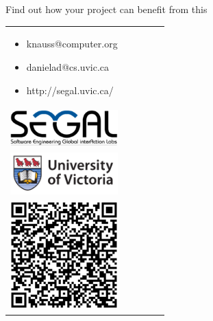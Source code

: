 \documentclass[final]{beamer} %
\begin{document}
\begin{frame}{}
\begin{columns}[b]
  \begin{column}{.45\linewidth}
    \begin{block}{Find out how your project can benefit from this}
    \begin{tabular}{v{.45\linewidth}V{0.23\linewidth}V{0.23\linewidth}}
  \vspace{-1cm}
    \begin{itemize}
    \item knauss{@}computer.org
    \item danielad{@}cs.uvic.ca
    \item http://segal.uvic.ca/
    \end{itemize}
& ~\\ \vspace{-1cm}
    \includegraphics[width=7cm]{img/segal-logo_wbg} \\  \vspace{2\columnsep}
    \includegraphics[width=7cm]{img/uvic-logo_wbg}
& ~\\ \vspace{-1cm}
   \includegraphics[width=5.5cm]{img/segalqrcode}
 \end{tabular}
 
 \vspace{-0.8cm}

   
  \end{block}

  \end{column}
\end{columns}  

\vfill
\end{frame}

  
\end{document}
